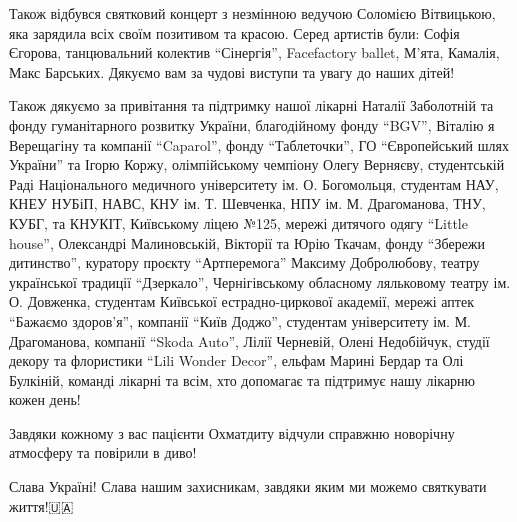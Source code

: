 Також відбувся святковий концерт з незмінною ведучою Соломією Вітвицькою, яка
зарядила всіх своїм позитивом та красою. Серед артистів були: Софія Єгорова,
танцювальний колектив \enquote{Сінергія}, Facefactory ballet, М'ята, Камалія, Макс
Барських. Дякуємо вам за чудові виступи та увагу до наших дітей!💫

Також дякуємо за привітання та підтримку нашої лікарні Наталії Заболотній та
фонду гуманітарного розвитку України, благодійному фонду \enquote{BGV}, Віталію я
Верещагіну та компанії \enquote{Caparol}, фонду \enquote{Таблеточки}, ГО \enquote{Європейський шлях
України} та Ігорю Коржу, олімпійському чемпіону Олегу Верняєву, студентській
Раді Національного медичного університету ім. О. Богомольця, студентам НАУ,
КНЕУ НУБіП, НАВС, КНУ ім. Т. Шевченка, НПУ ім. М. Драгоманова, ТНУ, КУБГ, та
КНУКІТ, Київському ліцею №125, мережі дитячого одягу \enquote{Little house}, Олександрі
Малиновській, Вікторії та Юрію Ткачам, фонду \enquote{Збережи дитинство}, куратору
проєкту \enquote{Артперемога} Максиму Добролюбову, театру української традиції
\enquote{Дзеркало}, Чернігівському обласному ляльковому театру ім. О. Довженка,
студентам Київської естрадно-циркової академії, мережі аптек \enquote{Бажаємо
здоров'я}, компанії \enquote{Київ Доджо}, студентам університету ім. М. Драгоманова,
компанії \enquote{Skoda Auto}, Лілії Черневій, Олені Недобійчук, студії декору та
флористики \enquote{Lili Wonder Decor}, ельфам Марині Бердар та Олі Булкіній, команді
лікарні та всім, хто допомагає та підтримує нашу лікарню кожен день!🙌

Завдяки кожному з вас пацієнти Охматдиту відчули справжню новорічну атмосферу
та повірили в диво!

Слава Україні! Слава нашим захисникам, завдяки яким ми можемо святкувати
життя!🇺🇦

